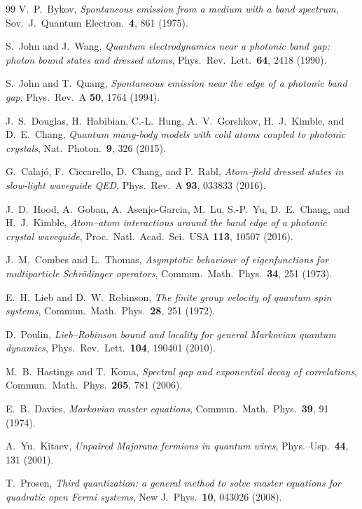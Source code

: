 \documentclass[11pt,a4paper]{article}
\theoremstyle{remark}
\begin{document}
\begin{thebibliography}{99}
 V.~P.~Bykov, \emph{Spontaneous emission from a medium with a band spectrum}, Sov.~J.~Quantum Electron.~\textbf{4}, 861 (1975).

 S.~John and J.~Wang, \emph{Quantum electrodynamics near a photonic band gap: photon bound states and dressed atoms}, Phys.~Rev.~Lett.~\textbf{64}, 2418 (1990).

 S.~John and T.~Quang, \emph{Spontaneous emission near the edge of a photonic band gap}, Phys.~Rev.~A \textbf{50}, 1764 (1994).

 J.~S.~Douglas, H.~Habibian, C.-L.~Hung, A.~V.~Gorshkov, H.~J.~Kimble, and D.~E.~Chang, \emph{Quantum many-body models with cold atoms coupled to photonic crystals}, Nat.~Photon.~\textbf{9}, 326 (2015).

 G.~Calaj\'o, F.~Ciccarello, D.~Chang, and P.~Rabl, \emph{Atom--field dressed states in slow-light waveguide QED}, Phys.~Rev.~A \textbf{93}, 033833 (2016).

 J.~D.~Hood, A.~Goban, A.~Asenjo-Garcia, M.~Lu, S.-P.~Yu, D.~E.~Chang, and H.~J.~Kimble, \emph{Atom--atom interactions around the band edge of a photonic crystal waveguide}, Proc.~Natl.~Acad.~Sci.~USA \textbf{113}, 10507 (2016).

 J.~M.~Combes and L.~Thomas, \emph{Asymptotic behaviour of eigenfunctions for multiparticle Schr\"odinger operators}, Commun.~Math.~Phys.~\textbf{34}, 251 (1973).

 E.~H.~Lieb and D.~W.~Robinson, \emph{The finite group velocity of quantum spin systems}, Commun.~Math.~Phys.~\textbf{28}, 251 (1972).

 D.~Poulin, \emph{Lieb--Robinson bound and locality for general Markovian quantum dynamics}, Phys.~Rev.~Lett.~\textbf{104}, 190401 (2010).

 M.~B.~Hastings and T.~Koma, \emph{Spectral gap and exponential decay of correlations}, Commun.~Math.~Phys.~\textbf{265}, 781 (2006).

 E.~B.~Davies, \emph{Markovian master equations}, Commun.~Math.~Phys.~\textbf{39}, 91 (1974).

 A.~Yu.~Kitaev, \emph{Unpaired Majorana fermions in quantum wires}, Phys.--Usp.~\textbf{44}, 131 (2001).

 T.~Prosen, \emph{Third quantization: a general method to solve master equations for quadratic open Fermi systems}, New J.~Phys.~\textbf{10}, 043026 (2008).


\end{thebibliography}
\end{document}
